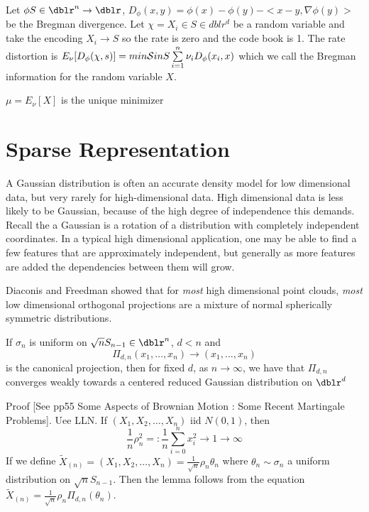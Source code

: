 Let $\phi S \in \dblr^n \to \dblr$, $D_\phi (x,y) = \phi(x) - \phi(y) - < x-y, \nabla \phi(y) >$ be the Bregman divergence. Let $\chi = {X_i} \in S \in dblr^d$ be a random variable and take the encoding $X_i \to S$ so the rate is zero and the code book is 1. The rate distortion is $E_\nu [D_\phi (\chi,s)] = min {\cal S} in S \sum\limits_{i=1}^{n} \nu_i D_\phi (x_i,x)$ which we call the Bregman information for the random variable $X$.
\begin{thm}
$\mu = E_\nu [X]$ is the unique minimizer
\end{thm}


\section{Sparse Representation}
A Gaussian distribution is often an accurate density model for low dimensional data, but very rarely for high-dimensional data. High dimensional data is less likely to be Gaussian, because of the high degree of independence this demands.  Recall the a Gaussian is a rotation of a distribution with completely independent coordinates. In a typical high dimensional application, one may be able to find a few features that are approximately independent, but generally as more features are added the dependencies between them will grow.

Diaconis and Freedman showed that for \textit{most} high dimensional point clouds, \textit{most} low dimensional orthogonal projections are a mixture of normal spherically symmetric distributions.

\begin{lem}
If $\sigma_n$ is uniform on $\sqrt{n}S_{n-1} \in \dblr^n$,  $d<n$ and
\begin{equation*}
\Pi_{d,n} ( x_1, \hdots , x_n) \rightarrow ( x_1, \hdots , x_n)
\end{equation*}
is the canonical projection, then for fixed $d$, as $ n \rightarrow \infty $, we have that
$\Pi_{d,n}$ converges weakly towards a centered reduced Gaussian distribution on $\dblr^d$
\end{lem}

Proof [See pp55 Some Aspects of Brownian Motion : Some Recent Martingale Problems].
Uee LLN.  If $(X_1,X_2, \hdots ,X_n)$ iid $N(0,1)$, then
\begin{equation*}
\frac{1}{n} \rho_{n}^{2} =: \frac{1}{n} \sum_{i=0}^{n} x_{i}^{2} \rightarrow 1  \rightarrow \infty
\end{equation*}
If we define $\tilde{X}_{(n)} = (X_1,X_2, \hdots ,X_n) = \frac{1}{\sqrt{n}} \rho_n \theta_n$ where $\theta_n \sim \sigma_n$ a uniform distribution on $\sqrt{n}S_{n-1}$.  Then the lemma follows from the equation $\tilde{X}_{(n)} = \frac{1}{\sqrt{n}} \rho_n  \Pi_{d,n} (\theta_n)$.


